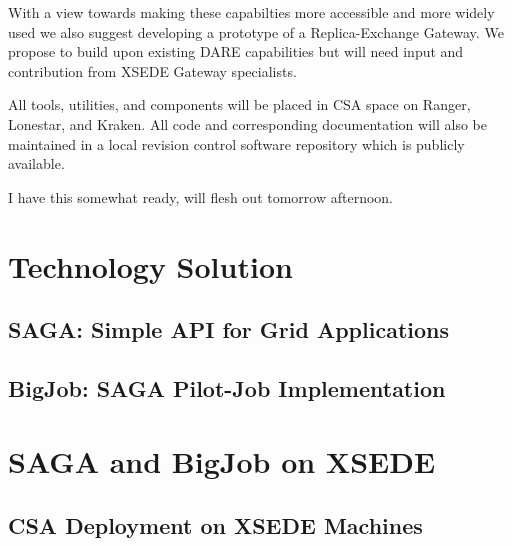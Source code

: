 \documentclass{sig-alternate}
\begin{document}
With a view towards making these capabilties more accessible  and more widely
used we also suggest developing a  prototype of a Replica-Exchange Gateway. We
propose to build upon existing DARE capabilities but will need input and
contribution from XSEDE  Gateway specialists.  

All tools, utilities, and components will be placed in CSA space on Ranger,
Lonestar, and Kraken. All code and corresponding documentation will also be
maintained in a local revision control software repository which is publicly
available.




I have this somewhat ready, will flesh out tomorrow
afternoon. 

\section{Technology Solution}
\subsection{SAGA: Simple API for Grid Applications}

\subsection{BigJob: SAGA Pilot-Job Implementation}

\section{SAGA and BigJob on XSEDE}

\subsection{CSA Deployment on XSEDE Machines}

\end{document}
